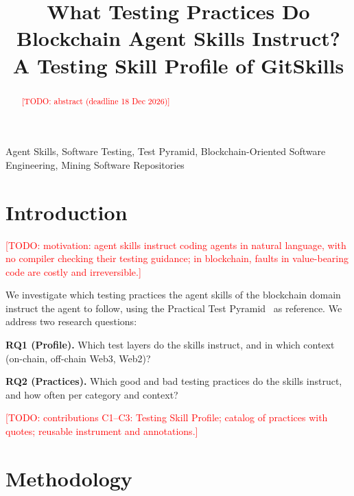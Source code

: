 \documentclass[10pt,conference]{IEEEtran}
\newcommand{\todo}[1]{\textcolor{red}{[TODO: #1]}}
\begin{document}
\title{What Testing Practices Do Blockchain Agent Skills Instruct?\\
A Testing Skill Profile of GitSkills}

\author{}

\maketitle

\begin{abstract}
\todo{abstract (deadline 18 Dec 2026)}
\end{abstract}

\begin{IEEEkeywords}
Agent Skills, Software Testing, Test Pyramid, Blockchain-Oriented Software Engineering, Mining Software Repositories
\end{IEEEkeywords}

\section{Introduction}
\label{sec:intro}

\todo{motivation: agent skills instruct coding agents in natural language, with no compiler checking their testing guidance; in blockchain, faults in value-bearing code are costly and irreversible.}

We investigate which testing practices the agent skills of the blockchain domain instruct the agent to follow, using the Practical Test Pyramid~\cite{vocke2018pyramid} as reference. We address two research questions:

\textbf{RQ1 (Profile).} Which test layers do the skills instruct, and in which context (on-chain, off-chain Web3, Web2)?

\textbf{RQ2 (Practices).} Which good and bad testing practices do the skills instruct, and how often per category and context?

\todo{contributions C1--C3: Testing Skill Profile; catalog of practices with quotes; reusable instrument and annotations.}

\section{Methodology}
\label{sec:method}
\end{document}
